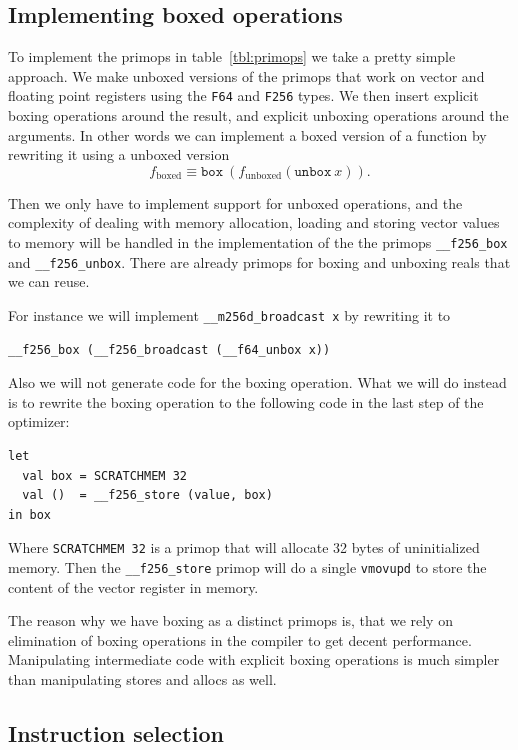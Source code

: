 \documentclass{article}
\begin{document}
\subsection{Implementing boxed operations}

To implement the primops in table~\ref{tbl:primops} we take a pretty simple approach. We make unboxed versions of the primops that work on vector and floating point registers using the \texttt{F64} and \texttt{F256} types. We then insert explicit boxing operations around the result, and explicit unboxing operations around the arguments. In other words we can implement a boxed version of a function by rewriting it using a unboxed version
\[
    f_{\mathrm{boxed}} \equiv \mathtt{box}\ (f_{\mathrm{unboxed}} (\mathtt{unbox}\ x)).
\]

Then we only have to implement support for unboxed operations, and the complexity of dealing with memory allocation, loading and storing vector values to memory will be handled in the implementation of the the primops \verb!__f256_box! and \verb!__f256_unbox!. There are already primops for boxing and unboxing reals that we can reuse.

For instance we will implement \verb!__m256d_broadcast x! by rewriting it to
\begin{verbatim}
__f256_box (__f256_broadcast (__f64_unbox x))
\end{verbatim}

Also we will not generate code for the boxing operation. What we will do instead is to rewrite the boxing operation to the following code in the last step of the optimizer:
\begin{lstlisting}
let
  val box = SCRATCHMEM 32
  val ()  = __f256_store (value, box)
in box
\end{lstlisting}
Where \verb!SCRATCHMEM 32! is a primop that will allocate 32 bytes of uninitialized memory. Then the \verb!__f256_store! primop will do a single \verb!vmovupd! to store the content of the vector register in memory.

The reason why we have boxing as a distinct primops is, that we rely on elimination of boxing operations in the compiler to get decent performance. Manipulating intermediate code with explicit boxing operations is much simpler than manipulating stores and allocs as well.

\subsection{Instruction selection}
\end{document}
